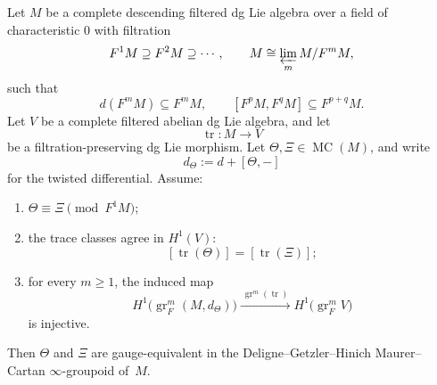 \begin{proposition}
\label{prop:frontier-filtered-trace-detecting-uniqueness}
Let $M$ be a complete descending filtered dg Lie algebra over a field of
characteristic $0$ with filtration
\[
F^1M \supseteq F^2M \supseteq \cdots,
\qquad
M \cong \varprojlim_m M/F^mM,
\]
such that
\[
d(F^mM) \subseteq F^mM,
\qquad
[F^pM,F^qM] \subseteq F^{p+q}M.
\]
Let $V$ be a complete filtered abelian dg Lie algebra, and let
\[
\operatorname{tr}\colon M \longrightarrow V
\]
be a filtration-preserving dg Lie morphism.
Let $\Theta,\Xi\in \operatorname{MC}(M)$, and write
\[
d_{\Theta}:=d+[\Theta,-]
\]
for the twisted differential.
Assume:
\begin{enumerate}[label=\textup{(\roman*)}]
\item $\Theta\equiv \Xi \pmod{F^1M}$;
\item the trace classes agree in $H^1(V)$:
  \[
  [\operatorname{tr}(\Theta)] = [\operatorname{tr}(\Xi)];
  \]
\item for every $m\ge 1$, the induced map
  \[
  H^1\!\bigl(\operatorname{gr}_F^m(M,d_{\Theta})\bigr)
  \xrightarrow{\ \operatorname{gr}^m(\operatorname{tr})\ }
  H^1\!\bigl(\operatorname{gr}_F^mV\bigr)
  \]
  is injective.
\end{enumerate}
Then $\Theta$ and $\Xi$ are gauge-equivalent in the
Deligne--Getzler--Hinich Maurer--Cartan $\infty$-groupoid of~$M$.
\end{proposition}

